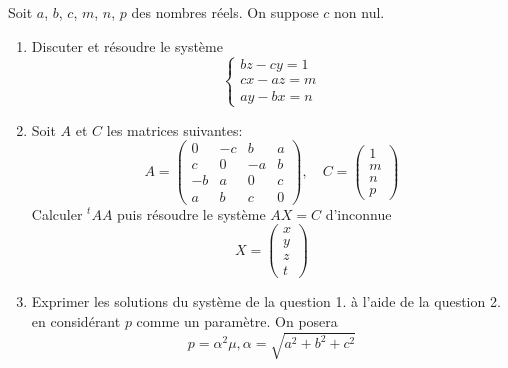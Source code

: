 Soit $a$, $b$, $c$, $m$, $n$, $p$ des nombres r{\'e}els. On
suppose $c$ non nul.
\begin{enumerate}
  \item Discuter et r{\'e}soudre le syst{\`e}me
  \[
  \left \{
\begin{array}{c}
  bz -cy=1\\
  cx-az=m\\
  ay-bx=n
\end{array}
  \right.
  \]
  \item Soit $A$ et $C$ les matrices suivantes:
  \[
  A=\left(
  \begin{array}{cccc}
    0 & -c & b & a \\
    c & 0 & -a & b \\
    -b & a & 0 & c \\
    a & b & c & 0
  \end{array}
  \right)
  ,\quad C=\left(
  \begin{array}{c}
  1\\m\\n\\p
  \end{array}
  \right)
  \]
  Calculer ${}^tAA$ puis r{\'e}soudre le syst{\`e}me $AX=C$ d'inconnue
  \[X=\left(
  \begin{array}{c}
  x\\y\\z\\t
  \end{array}
  \right)\]
  \item Exprimer les solutions du syst{\`e}me de la question 1. {\`a}
  l'aide de la question 2. en consid{\'e}rant $p$ comme un param{\`e}tre.
  On posera
  \[p=\alpha^2\mu , \alpha=\sqrt{a^2+b^2+c^2}\]
  
\end{enumerate}
